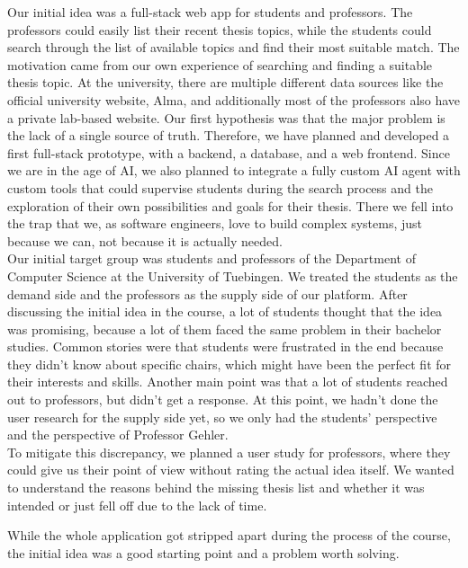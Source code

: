 \documentclass[11pt,a4paper]{article}
\begin{document}
\noindent Our initial idea was a full-stack web app for students and professors. The professors could easily list their recent thesis topics, while the students could 
search through the list of available topics and find their most suitable match. The motivation came from our own experience of searching and finding a suitable thesis topic. At the university, there are multiple different data sources like the official university 
website, Alma, and additionally most of the professors also have a private lab-based website. 
Our first hypothesis was that the major problem is the lack of a single source of truth. 
Therefore, we have planned and developed a first full-stack prototype, with a backend, a database, and a web frontend. Since we are in the age of AI, we also planned to integrate a fully custom AI agent with custom tools that could supervise students during the search process and the exploration of their own possibilities and goals for their thesis. 
There we fell into the trap that we, as software engineers, love to build complex systems, just because we can, not because it is actually needed.\\
Our initial target group was students and professors of the Department of Computer Science at the University of Tuebingen. 
We treated the students as the demand side and the professors as the supply side of our platform. After discussing the initial idea in the course, a lot of students thought that the idea was promising, because a lot of them faced the same problem in their bachelor studies. Common stories were that students were frustrated in the end because they didn't know about specific chairs, 
which might have been the perfect fit for their interests and skills. Another main point was that a lot of students reached out to professors, but didn't get a response.
At this point, we hadn't done the user research for the supply side yet, so we only had the students' perspective and the perspective of Professor Gehler.\\


\noindent To mitigate this discrepancy, we planned a user study for professors, where they could give us their point of view without rating the actual idea itself. We wanted to understand the reasons behind the missing thesis list and whether it was intended or just fell off due to the lack of time.



\noindent While the whole application got stripped apart during the process of the course, the initial idea was a good starting point and a problem worth solving.
\end{document}
